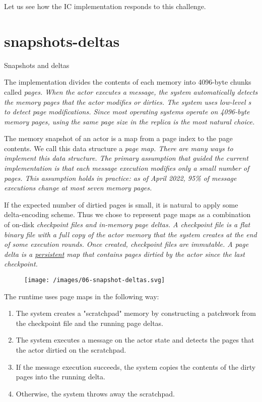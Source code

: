 \documentclass{article}
\begin{document}
Let us see how the IC implementation responds to this challenge.

\section{snapshots-deltas}{Snapshots and deltas}

The implementation divides the contents of each memory into 4096-byte chunks called \em{pages}.
When the actor executes a message, the system automatically detects the memory pages that the actor modifies or \em{dirties}.
The system uses low-level s to detect page modifications.
Since most operating systems operate on 4096-byte memory pages, using the same page size in the replica is the most natural choice.

The memory snapshot of an actor is a map from a page index to the page contents.
We call this data structure a \em{page map}.
There are many ways to implement this data structure.
The primary assumption that guided the current implementation is that each message execution modifies only a small number of pages.
This assumption holds in practice: as of April 2022, 95\% of message executions change at most seven memory pages.

If the expected number of dirtied pages is small, it is natural to apply some delta-encoding scheme.
Thus we chose to represent page maps as a combination of on-disk \em{checkpoint files} and in-memory \em{page deltas}.
A checkpoint file is a flat binary file with a full copy of the actor memory that the system creates at the end of some execution rounds.
Once created, checkpoint files are immutable.
A page delta is a \href{https://en.wikipedia.org/wiki/Persistent_data_structure}{persistent} map that contains pages dirtied by the actor since the last checkpoint.

\begin{figure}[grayscale-diagram]
\texttt{[image: /images/06-snapshot-deltas.svg]}
\end{figure}

The runtime uses page maps in the following way:
\begin{enumerate}
  \item The system creates a "scratchpad" memory by constructing a patchwork from the checkpoint file and the running page deltas.
  \item The system executes a message on the actor state and detects the pages that the actor dirtied on the scratchpad.
  \item If the message execution succeeds, the system copies the contents of the dirty pages into the running delta.
  \item Otherwise, the system throws away the scratchpad.
\end{enumerate}
\end{document}
